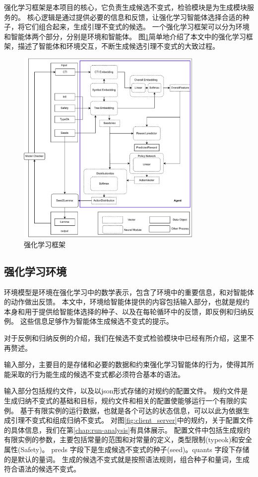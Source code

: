 强化学习框架是本项目的核心，它负责生成候选不变式，检验模块是为生成模块服务的。
\rltla 核心逻辑是通过提供必要的信息和反馈，让强化学习智能体选择合适的种子，将它们组合起来，生成引理不变式的候选。
一个强化学习框架可以分为环境和智能体两个部分，分别是环境和智能体。
图\ref{fig:agent_env}简单地介绍了本文中的强化学习框架，描述了智能体和环境交互，不断生成候选引理不变式的大致过程。
\begin{figure}[h]
	\centering
	\includegraphics[width=0.8\textwidth]{figures/agent_env.pdf}
	\caption{\rltla 强化学习框架}
	\label{fig:agent_env}
\end{figure}

\subsection{强化学习环境}

环境模型是环境在强化学习中的数学表示，包含了环境中的重要信息，和对智能体的动作做出反馈。
本文中，环境给智能体提供的内容包括输入部分，也就是\TLA 规约本身和用于提供给智能体选择的种子、以及在每轮循环中的反馈，即反例和归纳反例。
这些信息足够作为智能体生成候选不变式的提示。

对于反例和归纳反例的介绍，我们在候选不变式检验模块中已经有所介绍，这里不再赘述。

输入部分，主要目的是存储和必要的数据和约束强化学习智能体的行为，使得其所能采取的行为能生成的候选不变式都必须符合基本的语法。

输入部分包括\TLA 规约文件，以及以json形式存储的对规约的配置文件。
\TLA 规约文件是生成归纳不变式的基础和目标，规约文件和相关的配置使\rltla 能够运行一个有限的实例。
基于有限实例的运行数据，也就是各个可达的状态信息，\rltla 可以以此为依据生成引理不变式和组成归纳不变式。
对图\ref{fig:client_server}中的规约，关于配置文件的具体信息，我们在第\ref{chap:run-analysis}有具体展示。
配置文件中包括生成规约有限实例的参数，主要包括常量的范围和对常量的定义，类型限制(typeok)和安全属性(Safety)。
preds 字段下是生成候选不变式的种子(seed)。quants 字段下存储的是默认的量词。
生成的候选不变式就是按照语法规则，组合种子和量词，生成符合语法的候选不变式。

